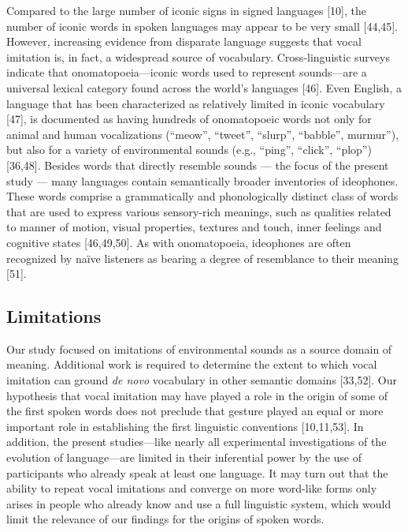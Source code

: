 \documentclass[english,floatsintext,man]{apa6}
\theoremstyle{definition}
\theoremstyle{definition}
\theoremstyle{definition}
\theoremstyle{remark}
\begin{document}
Compared to the large number of iconic signs in signed languages
{[}10{]}, the number of iconic words in spoken languages may appear to
be very small {[}44,45{]}. However, increasing evidence from disparate
language suggests that vocal imitation is, in fact, a widespread source
of vocabulary. Cross-linguistic surveys indicate that
onomatopoeia---iconic words used to represent sounds---are a universal
lexical category found across the world's languages {[}46{]}. Even
English, a language that has been characterized as relatively limited in
iconic vocabulary {[}47{]}, is documented as having hundreds of
onomatopoeic words not only for animal and human vocalizations
(\enquote{meow}, \enquote{tweet}, \enquote{slurp}, \enquote{babble},
murmur''), but also for a variety of environmental sounds (e.g.,
\enquote{ping}, \enquote{click}, \enquote{plop}) {[}36,48{]}. Besides
words that directly resemble sounds --- the focus of the present study
--- many languages contain semantically broader inventories of
ideophones. These words comprise a grammatically and phonologically
distinct class of words that are used to express various sensory-rich
meanings, such as qualities related to manner of motion, visual
properties, textures and touch, inner feelings and cognitive states
{[}46,49,50{]}. As with onomatopoeia, ideophones are often recognized by
naïve listeners as bearing a degree of resemblance to their meaning
{[}51{]}.

\hypertarget{limitations}{%
\subsection{Limitations}\label{limitations}}

Our study focused on imitations of environmental sounds as a source
domain of meaning. Additional work is required to determine the extent
to which vocal imitation can ground \emph{de novo} vocabulary in other
semantic domains {[}33,52{]}. Our hypothesis that vocal imitation may
have played a role in the origin of some of the first spoken words does
not preclude that gesture played an equal or more important role in
establishing the first linguistic conventions {[}10,11,53{]}. In
addition, the present studies---like nearly all experimental
investigations of the evolution of language---are limited in their
inferential power by the use of participants who already speak at least
one language. It may turn out that the ability to repeat vocal
imitations and converge on more word-like forms only arises in people
who already know and use a full linguistic system, which would limit the
relevance of our findings for the origins of spoken words.
\end{document}
